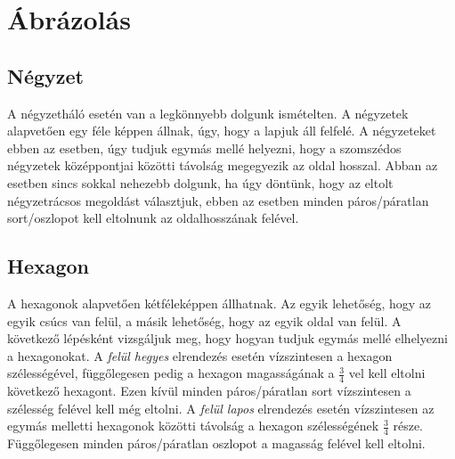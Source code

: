 \section{Ábrázolás}

\subsection{Négyzet}

A négyzetháló esetén van a legkönnyebb dolgunk ismételten. A négyzetek alapvetően egy féle képpen állnak, úgy, hogy a lapjuk áll felfelé.  A négyzeteket ebben az esetben, úgy tudjuk egymás mellé helyezni, hogy a szomszédos négyzetek középpontjai közötti távolság megegyezik az oldal hosszal. 
\newline
\newline Abban az esetben sincs sokkal nehezebb dolgunk, ha úgy döntünk, hogy az eltolt négyzetrácsos megoldást választjuk, ebben az esetben minden páros/páratlan sort/oszlopot kell eltolnunk az oldalhosszának felével.

\subsection{Hexagon}

A hexagonok alapvetően kétféleképpen állhatnak. Az egyik lehetőség, hogy az egyik csúcs van felül, a másik lehetőség, hogy az egyik oldal van felül. 
\newline
\newline A következő lépésként vizsgáljuk meg, hogy hogyan tudjuk egymás mellé elhelyezni a hexagonokat.
\newline
\newline A \textit{felül hegyes} elrendezés esetén vízszintesen a hexagon szélességével, függőlegesen pedig a hexagon magasságának a $\frac{3}{4}$ vel kell eltolni következő hexagont. Ezen kívül minden páros/páratlan sort vízszintesen a szélesség felével kell még eltolni.
\newline
\newline A \textit{felül lapos} elrendezés esetén vízszintesen az egymás melletti hexagonok közötti távolság a hexagon szélességének $\frac{3}{4}$ része. Függőlegesen minden páros/páratlan oszlopot a magasság felével kell eltolni.

